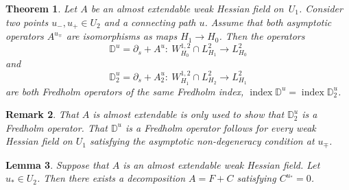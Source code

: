 \documentclass[pdftex]{sigma}
\numberwithin{equation}{section}
\newtheorem{Theorem}{Theorem}[section]
\newtheorem{Lemma}[Theorem]{Lemma}
\newtheorem{Remark}[Theorem]{Remark}
\newcommand{\D}{{\mathbb{D}}}
\newcommand{\INDEX}{\mathop{\mathrm{index}}} %
\newcommand{\p}{{\partial}}
\newcommand{\1}{{{\mathchoice {\rm 1\mskip-4mu l} {\rm 1\mskip-4mu l}
{\rm 1\mskip-4.5mu l} {\rm 1\mskip-5mu l}}}}
\begin{document}
\begin{Theorem}\label{thm:main}
Let $A$ be an almost extendable weak Hessian field on~$U_1$.
Consider two points $u_-,u_+\in U_2$ and a connecting path $u$.
Assume that both asymptotic operators
$A^{u_\mp}$ are isomorphisms as maps $H_1\to H_0$.
Then the operators
\begin{equation*}%
 \D^u=\p_s+A^u\colon\
 W^{1,2}_{H_0}\cap L^2_{H_1}
 \to L^2_{H_0}
\end{equation*}
and
\begin{equation*}%
 \D^u_2=\p_s+A^u_2\colon\
 W^{1,2}_{H_1}\cap L^2_{H_2}
 \to L^2_{H_1}
\end{equation*}
are both Fredholm operators of the same Fredholm index,
$\INDEX \D^u=\INDEX \D^u_2$.
\end{Theorem}

\begin{Remark}%
That $A$ is almost extendable is only used to show that $\D^u_2$ is a
Fredholm operator.
That $\D^u$ is a Fredholm operator follows for every weak Hessian field
on $U_1$ satisfying the asymptotic non-degeneracy condition at $u_\mp$.
\end{Remark}

\begin{Lemma}\label{le:decomp}
Suppose that $A$ is an almost extendable weak Hessian field.
Let $u_*\in U_2$.
Then there exists a decomposition $A=F+C$ satisfying $C^{u_*}=0$.
\end{Lemma}
\end{document}
